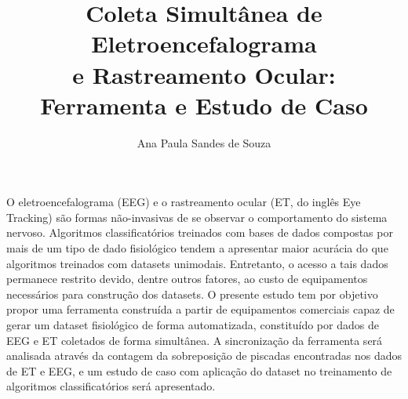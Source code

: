 \documentclass[a4paper, 12pt]{ppgeb}
\title{Coleta Simultânea de Eletroencefalograma \\ e Rastreamento Ocular: Ferramenta e Estudo de Caso}
\author{Ana Paula Sandes de Souza}
\begin{document}
\maketitle

%
%
%
%
%
%

%
%

%
%


\acresetall %
\vspace{12pt}

O eletroencefalograma (EEG) e o rastreamento ocular (ET, do inglês Eye Tracking) são formas não-invasivas de se observar o comportamento do sistema nervoso. Algoritmos classificatórios treinados com bases de dados compostas por mais de um tipo de dado fisiológico tendem a apresentar maior acurácia do que algoritmos treinados com datasets unimodais. Entretanto, o acesso a tais dados permanece restrito devido, dentre outros fatores, ao custo de equipamentos necessários para construção dos datasets. O presente estudo tem por objetivo propor uma ferramenta construída a partir de equipamentos comerciais capaz de gerar um dataset fisiológico de forma automatizada, constituído por dados de EEG e ET coletados de forma simultânea. A sincronização da ferramenta será analisada através da contagem da sobreposição de piscadas encontradas nos dados de ET e EEG, e um estudo de caso com aplicação do dataset no treinamento de algoritmos classificatórios será apresentado. 
\end{document}
